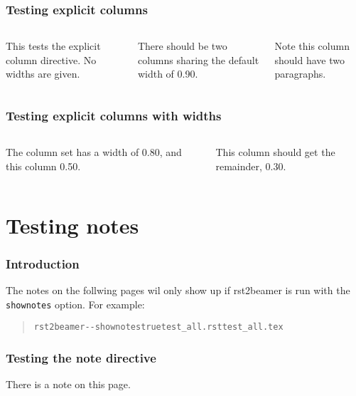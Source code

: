 \documentclass[t]{beamer}
\begin{document}
\begin{frame}[fragile]
\frametitle{Testing explicit columns}

\begin{columns}[T]

This tests the explicit column directive. No widths are given.


There should be two columns sharing the default width of 0.90.

Note this column should have two paragraphs.

\end{columns}

\end{frame}

\begin{frame}[fragile]
\frametitle{Testing explicit columns with widths}

\begin{columns}[T]

The column set has a width of 0.80, and this column 0.50.


This column should get the remainder, 0.30.

\end{columns}

\end{frame}


\section{Testing notes%
  \label{testing-notes}%
}

\begin{frame}[fragile]
\frametitle{Introduction}


The notes on the follwing pages wil only show up if rst2beamer is run with
the \texttt{shownotes} option. For example:

\begin{quote}
\begin{alltt}
rst2beamer -{}-shownotes true test_all.rst test_all.tex
\end{alltt}
\end{quote}

\end{frame}

\begin{frame}[fragile]
\frametitle{Testing the note directive}


There is a note on this page.

\end{frame}
\end{document}
